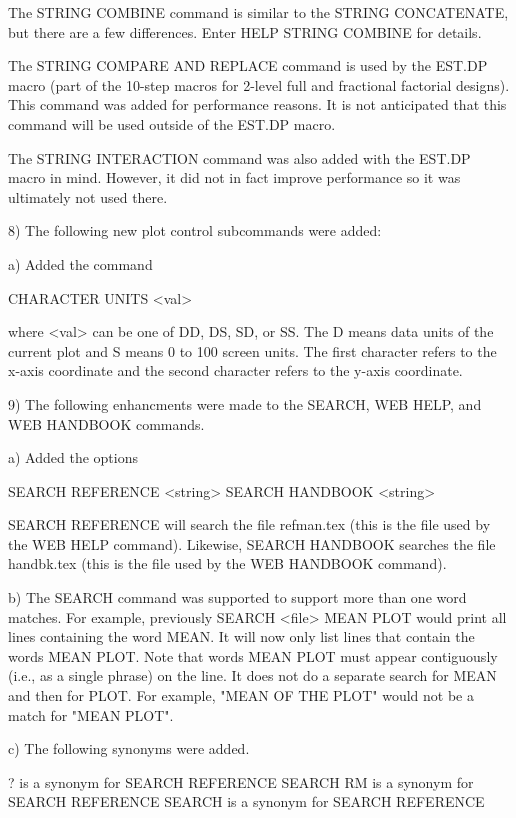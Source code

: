     The STRING COMBINE command is similar to the STRING CONCATENATE, but
    there are a few differences.  Enter HELP STRING COMBINE for details.

    The STRING COMPARE AND REPLACE command is used by the EST.DP macro
    (part of the 10-step macros for 2-level full and fractional factorial
    designs).  This command was added for performance reasons.  It is not
    anticipated that this command will be used outside of the EST.DP macro.

    The STRING INTERACTION command was also added with the EST.DP macro
    in mind.  However, it did not in fact improve performance so it was
    ultimately not used there.

 8) The following new plot control subcommands were added:

    a) Added the command

         CHARACTER UNITS <val> 

       where <val> can be one of DD, DS, SD, or SS.  The D means data
       units of the current plot and S means 0 to 100 screen units.
       The first character refers to the x-axis coordinate and the
       second character refers to the y-axis coordinate.

 9) The following enhancments were made to the SEARCH, WEB HELP,
    and WEB HANDBOOK commands.

    a) Added the options

         SEARCH REFERENCE <string>
         SEARCH HANDBOOK  <string>

       SEARCH REFERENCE will search the file refman.tex (this is the
       file used by the WEB HELP command).  Likewise, SEARCH HANDBOOK
       searches the file handbk.tex (this is the file used by the
       WEB HANDBOOK command).

    b) The SEARCH command was supported to support more than one
       word matches.  For example, previously
       SEARCH <file> MEAN PLOT would print all lines containing the
       word MEAN.  It will now only list lines that contain the
       words MEAN PLOT.  Note that words MEAN PLOT must appear
       contiguously (i.e., as a single phrase) on the line.
       It does not do a separate search for MEAN and then for
       PLOT.  For example, "MEAN OF THE PLOT" would not be a
       match for "MEAN PLOT".

    c) The following synonyms were added.

          ? is a synonym for SEARCH REFERENCE
          SEARCH RM is a synonym for SEARCH REFERENCE
          SEARCH is a synonym for SEARCH REFERENCE

